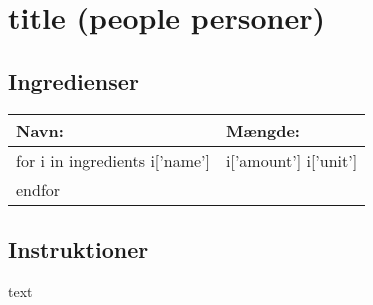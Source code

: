\section{ {{title}} ({{people}} personer)}

\subsection*{Ingredienser}

\begin{tabular}{|l|l|}
  \hline
  \bf{Navn:} & \bf{Mængde:} \\
  \hline\hline

  {{for i in ingredients}}
    {{i['name']}} & {{i['amount']}} {{i['unit']}} \\
  {{endfor}}

  \hline
\end{tabular}

\subsection*{Instruktioner}

{{text}}

